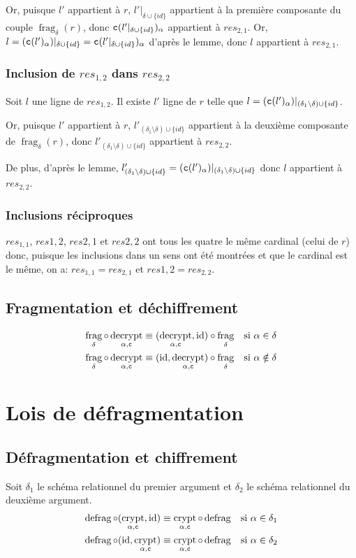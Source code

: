 \documentclass[french]{article}
\DeclareMathOperator{\frag}{frag}
\DeclareMathOperator{\defrag}{defrag}
\DeclareMathOperator{\crypt}{crypt}
\DeclareMathOperator{\decrypt}{decrypt}
\DeclareMathOperator{\id}{id}
\newcommand\typeT[1]{\text{\ttfamily #1}}
\newcommand{\decryptArgs}[2]{\decrypt_{#1 , \typeT{#2}}}
\newcommand{\cryptArgs}[2]{\crypt_{#1 , \typeT{#2}}}
\newcommand{\decryptCAlpha}{\decryptArgs{\alpha}{c}}
\newcommand{\cryptCAlpha}{\cryptArgs{\alpha}{c}}
\newcommand{\fragDelta}{\frag_{\delta}}
\newcommand{\cy}[1]{\typeT{c}(#1)}
\newcommand{\cip}{\cup \{id\}}
\newcommand{\dilta}{{\delta \cip}}
\newcommand{\args}{Soit $\delta_1$ le schéma relationnel du premier
	argument et $\delta_2$ le schéma relationnel du deuxième
	argument.}
\begin{document}
Or, puisque $l'$ appartient à $r$,
$l'|_\dilta$ appartient à la première composante du
couple
$\fragDelta(r)$, donc
$\cy{l'|_\dilta}_\alpha$ appartient à $res_{2,1}$.
Or, $l = (\cy{l'}_\alpha)|_\dilta = \cy{l'|_\dilta}_\alpha$
d'après le lemme, donc $l$ appartient à $res_{2,1}$.

\subsubsection*{Inclusion de $res_{1,2}$ dans $res_{2,2}$}
Soit $l$ une ligne de $res_{1,2}$.
Il existe $l'$ ligne de $r$ telle que
$l = (\cy{l'}_\alpha)|_{(\delta_1 \setminus \delta) \cip}$.

Or, puisque $l'$ appartient à $r$,
$l'_{(\delta_1 \setminus \delta) \cip}$ appartient à la deuxième
composante de $\fragDelta(r)$, donc
$l'_{(\delta_1 \setminus \delta) \cip}$ appartient à $res_{2,2}$.

De plus, d'après le lemme,
$l'_{(\delta_1 \setminus \delta) \cip}
= (\cy{l'}_\alpha)|_{(\delta_1 \setminus \delta) \cip}$
donc $l$ appartient à $res_{2,2}$.

\subsubsection*{Inclusions réciproques}
$res_{1,1}$, $res{1,2}$, $res{2,1}$ et 
$res{2,2}$ ont tous les quatre le même cardinal
(celui de $r$) donc, puisque les inclusions dans un sens ont été montrées
et que le cardinal est le même, on a:
$res_{1,1} = res_{2,1}$ et $res{1,2} = res_{2,2}$.

\subsection*{Fragmentation et déchiffrement}
\begin{align}
\fragDelta \circ \decryptCAlpha
& \equiv (\decryptCAlpha, \id) \circ \fragDelta
& \text{si $\alpha \in \delta$} \\
\fragDelta \circ \decryptCAlpha
& \equiv (\id, \decryptCAlpha) \circ \fragDelta
& \text{si $\alpha \notin \delta$}
\end{align}

\section*{Lois de défragmentation}
\subsection*{Défragmentation et chiffrement}
\args
\begin{align}
\defrag \circ (\cryptCAlpha, \id)
& \equiv \cryptCAlpha \circ \defrag 
& \text{si $\alpha \in \delta_1$} \\
\defrag \circ (\id, \cryptCAlpha)
& \equiv \cryptCAlpha \circ \defrag 
& \text{si $\alpha \in \delta_2$} 
\end{align}
\end{document}
